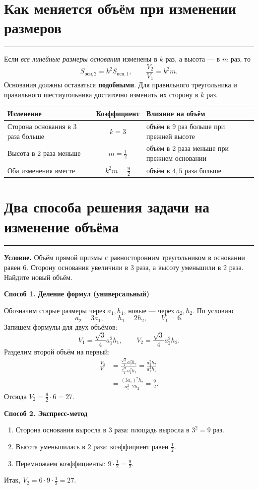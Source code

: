 \documentclass[a4paper,12pt]{article}
\newcommand{\topic}[1]{\needspace{6\baselineskip}\section{#1}\vspace{-1.5mm}\noindent\textcolor{accent}{\rule{\linewidth}{0.45pt}}\vspace{-2mm}}
\newcommand{\ex}[1]{\par\medskip\noindent\textcolor{darkaccent}{\textbf{#1}}\par\smallskip}
\begin{document}
\topic{Как меняется объём при изменении размеров}
Если \emph{все линейные размеры основания} изменены в $k$ раз, а высота --- в $m$ раз, то
\[
S_{\text{осн},2}=k^2S_{\text{осн},1}, \qquad
\boxed{\frac{V_2}{V_1}=k^2m}.
\]
Основания должны оставаться \textbf{подобными}. Для правильного треугольника и правильного шестиугольника достаточно изменить их сторону в $k$ раз.

\begin{center}
\begin{tabularx}{\linewidth}{@{}XcX@{}}
\toprule
Изменение & Коэффициент & Влияние на объём \\
\midrule
Сторона основания в $3$ раза больше & $k=3$ & объём в $9$ раз больше при прежней высоте \\
Высота в $2$ раза меньше & $m=\frac12$ & объём в $2$ раза меньше при прежнем основании \\
Оба изменения вместе & $k^2m=\frac92$ & объём в $4{,}5$ раза больше \\
\bottomrule
\end{tabularx}
\end{center}

\clearpage
\topic{Два способа решения задачи на изменение объёма}
\textbf{Условие.} Объём прямой призмы с равносторонним треугольником в основании равен $6$. Сторону основания увеличили в $3$ раза, а высоту уменьшили в $2$ раза. Найдите новый объём.

\ex{Способ 1. Деление формул (универсальный)}
Обозначим старые размеры через $a_1,h_1$, новые --- через $a_2,h_2$. По условию
\[
a_2=3a_1,\qquad h_1=2h_2,\qquad V_1=6.
\]
Запишем формулы для двух объёмов:
\[
V_1=\frac{\sqrt3}{4}a_1^2h_1,
\qquad
V_2=\frac{\sqrt3}{4}a_2^2h_2.
\]
Разделим второй объём на первый:
\begin{align*}
\frac{V_2}{V_1}
&=\frac{\frac{\sqrt3}{4}a_2^2h_2}
{\frac{\sqrt3}{4}a_1^2h_1}
=\frac{a_2^2h_2}{a_1^2h_1}\\
&=\frac{(3a_1)^2h_2}{a_1^2\cdot 2h_2}
=\frac92.
\end{align*}
Отсюда \(V_2=\frac92\cdot6=\boxed{27}\).

\ex{Способ 2. Экспресс-метод}
\begin{enumerate}
\item Сторона основания выросла в $3$ раза: площадь выросла в $3^2=9$ раз.
\item Высота уменьшилась в $2$ раза: коэффициент равен $\frac12$.
\item Перемножаем коэффициенты: $9\cdot\frac12=\frac92$.
\end{enumerate}
Итак, \(\displaystyle V_2=6\cdot9\cdot\frac12=\boxed{27}\).
\end{document}
